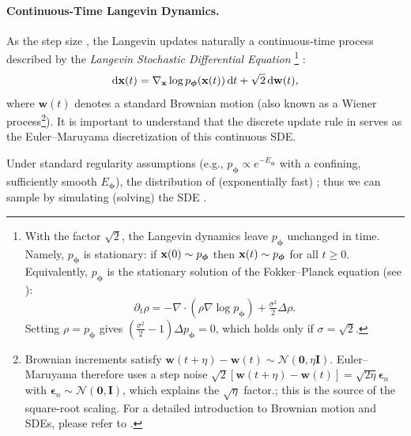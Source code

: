 \paragraph{Continuous-Time Langevin Dynamics.}
As the step size , the  Langevin updates naturally  a continuous-time process described by the \emph{Langevin Stochastic Differential Equation }\footnote{
With the factor $\sqrt{2}$, the Langevin dynamics leave $p_{\bm\phi}$ unchanged in time. Namely, $p_{\bm\phi}$ is stationary: if ${\mathbf{x}}(0)\sim p_{\bm\phi}$ then ${\mathbf{x}}(t)\sim p_{\bm\phi}$ for all $t\ge 0$. Equivalently, $p_{\bm\phi}$ is the stationary solution of the Fokker–Planck equation (see ):
\[
\partial_t \rho = -\nabla \cdot(\rho  \nabla\log p_{\bm\phi}) + \tfrac{\sigma^2}{2}\Delta \rho.
\]
Setting $\rho=p_{\bm\phi}$ gives $(\tfrac{\sigma^2}{2}-1)\Delta p_{\bm\phi}=0$, which holds only if $\sigma=\sqrt{2}$.
}
:
\begin{align}\label{eq:continuous-langevin}
 \mathop{}\!\mathrm{d} \mathbf{x}(t) = \nabla_{\mathbf{x}} \log p_{\bm{\phi}}(\mathbf{x}(t)) \mathop{}\!\mathrm{d} t + \sqrt{2} \mathop{}\!\mathrm{d} \mathbf{w}(t),
\end{align}
where $\mathbf{w}(t)$ denotes a standard Brownian motion (also known as a Wiener process\footnote{Brownian increments satisfy
$\mathbf{w}(t+\eta)-\mathbf{w}(t)\sim \mathcal{N}(\mathbf{0},  \eta  \mathbf{I})$.
Euler–Maruyama therefore uses a step noise $\sqrt{2}  [\mathbf{w}(t+\eta)-\mathbf{w}(t)]
= \sqrt{2\eta}  \bm{\epsilon}_n$ with $\bm{\epsilon}_n \sim \mathcal{N}(\mathbf{0},\mathbf{I})$,
which explains the $\sqrt{\eta}$ factor.; this is the source of the square-root scaling. For a detailed introduction to Brownian motion and SDEs, please refer to .}). It is important to understand that the discrete update rule in  serves as the Euler–Maruyama discretization of this continuous SDE.


Under standard regularity assumptions (e.g., $p_{\bm{\phi}}\propto e^{-E_{\bm{\phi}}}$ with a confining, sufficiently smooth $E_{\bm{\phi}}$), the distribution of  (exponentially fast) ; thus we can sample by simulating (solving) the SDE . 



